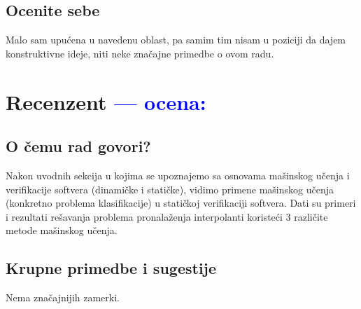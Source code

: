 \documentclass[a4paper]{report}
\newcommand{\odgovor}[1]{\textcolor{blue}{#1}}
\begin{document}
\section{Ocenite sebe}
Malo sam upućena u navedenu oblast, pa samim tim nisam u poziciji da dajem konstruktivne ideje, niti neke značajne primedbe o ovom radu.

\chapter{Recenzent \odgovor{--- ocena:} }


\section{O čemu rad govori?}
Nakon uvodnih sekcija u kojima se upoznajemo sa osnovama mašinskog učenja i verifikacije softvera (dinamičke i statičke), vidimo primene mašinskog učenja (konkretno problema klasifikacije) u statičkoj verifikaciji softvera. Dati su primeri i rezultati rešavanja problema pronalaženja interpolanti koristeći 3 različite metode mašinskog učenja.

\section{Krupne primedbe i sugestije}
Nema značajnijih zamerki.
\end{document}
